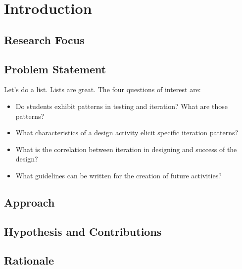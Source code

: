\chapter{Introduction}

\section{Research Focus}
 
\section{Problem Statement}
Let's do a list. Lists are great. The four questions of interest are:
\begin{itemize}
\item Do students exhibit patterns in testing and iteration? What are those patterns?
\item What characteristics of a design activity elicit specific iteration patterns?
\item What is the correlation between iteration in designing and success of the design?
\item What guidelines can be written for the creation of future activities?
\end{itemize}


\section{Approach}

\section{Hypothesis and Contributions}

\section{Rationale}
